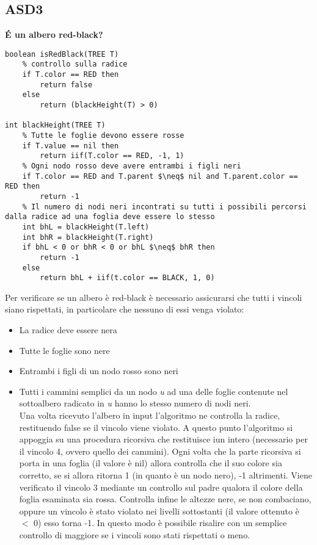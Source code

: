 \documentclass[../cheatSheetAlgoritmi.tex]{subfiles}
\begin{document}
\subsection{ASD3}
\textbf{É un albero red-black?}

\begin{lstlisting}[caption=É un albero red-black?]
boolean isRedBlack(TREE T)
	% controllo sulla radice
  	if T.color == RED then
    	return false
  	else
    	return (blackHeight(T) > 0)

int blackHeight(TREE T)
  	% Tutte le foglie devono essere rosse
  	if T.value == nil then
    	return iif(T.color == RED, -1, 1)
  	% Ogni nodo rosso deve avere entrambi i figli neri
  	if T.color == RED and T.parent $\neq$ nil and T.parent.color == RED then
    	return -1
  	% Il numero di nodi neri incontrati su tutti i possibili percorsi dalla radice ad una foglia deve essere lo stesso
  	int bhL = blackHeight(T.left)
  	int bhR = blackHeight(T.right)
  	if bhL < 0 or bhR < 0 or bhL $\neq$ bhR then
    	return -1
  	else
    	return bhL + iif(t.color == BLACK, 1, 0)
\end{lstlisting}
Per verificare se un albero è red-black è necessario assicurarsi che tutti i vincoli siano rispettati, in particolare che nessuno di essi venga violato:
\begin{itemize}
 	\item La radice deve essere nera
 	\item Tutte le foglie sono nere
 	\item Entrambi i figli di un nodo rosso sono neri
 	\item Tutti i cammini semplici da un nodo \textit{u} ad una delle foglie contenute nel sottoalbero radicato in \textit{u} hanno lo stesso numero di nodi neri.\\ Una volta ricevuto l'albero in input l'algoritmo ne controlla la radice, restituendo false se il vincolo viene violato. A questo punto l'algoritmo si appoggia su una procedura ricorsiva che restituisce iun intero (necessario per il vincolo 4, ovvero quello dei cammini).
Ogni volta che la parte ricorsiva si porta in una foglia (il valore è nil) allora controlla che il suo colore sia corretto, se si allora ritorna 1 (in quanto è un nodo nero), -1 altrimenti. Viene verificato il vincolo 3 mediante un controllo sul padre qualora il colore della foglia esaminata sia rossa. Controlla infine le altezze nere, se non combaciano, oppure un vincolo è stato violato nei livelli sottostanti (il valore ottenuto è $<$ 0) esso torna -1. In questo modo è possibile risalire con un semplice controllo di maggiore se i vincoli sono stati rispettati o meno.
\end{itemize}\
\end{document}
